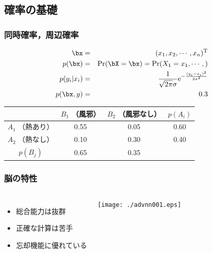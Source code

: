 \documentclass[14pt,dvipdfmx]{beamer}
\begin{document}
\subsection{確率の基礎}

\begin{frame}
  \frametitle{同時確率，周辺確率}

\begin{eqnarray}
\bx & = & (x_1,x_2, \cdots, x_n)^{\rm T} \\
p(\bx) & = & \Pr ( \bX = \bx ) = \Pr ( X_1=x_1, \cdots, ) \\
p(y_i | x_i) & = & \frac{1}{\sqrt{2\pi} \sigma } {\rm e}^{-\frac{(y_i - x_i)^2}{2\sigma^2}}\\
p(\bx,y) & = & 0.3 
\end{eqnarray}

\begin{center}
{\small 
\begin{tabular}{|c|c|c|c|} \hline
& $B_1$ （風邪） & $B_2$ （風邪なし） & $p(A_i)$ \\ \hline
$A_1$ （熱あり）& 0.55 & 0.05 & 0.60  \\
$A_2$ （熱なし）& 0.10 & 0.30 & 0.40 \\ \hline
$p(B_j)$ & 0.65 & 0.35 & \\ \hline
\end{tabular}
}
\end{center}

\end{frame}


\begin{frame}

\frametitle{脳の特性}

\begin{columns}[c]

\column{60mm}

 \begin{itemize}

\item 総合能力は抜群

\item 正確な計算は苦手

\item 忘却機能に優れている

 \end{itemize}

\column{60mm}

\texttt{[image: ./advnn001.eps]} 

\end{columns}

\end{frame}
\end{document}
